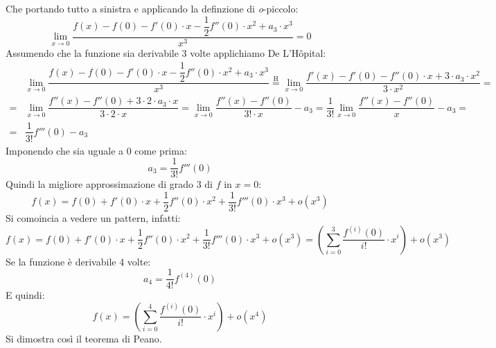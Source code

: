 Che portando tutto a sinistra e applicando la definzione di \textit{o}-piccolo:
\begin{equation*}
	\lim_{x \to 0} \dfrac{f(x) - f(0) - f'(0) \cdot x - \dfrac{1}{2} f''(0) \cdot x^2 + a_3 \cdot x^3}{x^3} = 0
\end{equation*}
Assumendo che la funzione sia derivabile 3 volte applichiamo De L'Hôpital:
\begin{align*}
	&\lim_{x \to 0} \dfrac{f(x) - f(0) - f'(0) \cdot x - \dfrac{1}{2} f''(0) \cdot x^2 + a_3 \cdot x^3}{x^3} \stackrel{\text{H}}{=} \lim_{x \to 0} \dfrac{f'(x) - f'(0) - f''(0) \cdot x + 3 \cdot a_3 \cdot x^2}{3 \cdot x^2} = \\[10pt]
	= &\lim_{x \to 0} \dfrac{f''(x) - f''(0) + 3 \cdot 2 \cdot a_3 \cdot x}{3 \cdot 2 \cdot x} = \lim_{x \to 0} \dfrac{f''(x) - f''(0)}{3! \cdot x} - a_3 = \dfrac{1}{3!} \lim_{x \to 0} \dfrac{f''(x) - f''(0)}{x} - a_3 = \\[10pt]
	= &\dfrac{1}{3!} f'''(0) - a_3
\end{align*}
Imponendo che sia uguale a 0 come prima:
\begin{equation*}
	a_3 = \dfrac{1}{3!} f'''(0)
\end{equation*}
Quindi la migliore approssimazione di grado 3 di $f$ in $x = 0$:
\begin{equation*}
	f(x) = f(0) + f'(0) \cdot x + \dfrac{1}{2} f''(0) \cdot x^2 + \dfrac{1}{3!} f'''(0) \cdot x^3 + o(x^3)
\end{equation*}
Si comoincia a vedere un pattern, infatti:
\begin{equation*}
	f(x) = f(0) + f'(0) \cdot x + \dfrac{1}{2} f''(0) \cdot x^2 + \dfrac{1}{3!} f'''(0) \cdot x^3 + o(x^3) = \left( \sum \limits_{i = 0}^3 \dfrac{f^{(i)}(0)}{i!} \cdot x^i \right) + o(x^3)
\end{equation*}
Se la funzione è derivabile 4 volte:
\begin{equation*}
	a_4 = \dfrac{1}{4!} f^{(4)}(0)
\end{equation*}
E quindi:
\begin{equation*}
	f(x) = \left( \sum \limits_{i = 0}^4 \dfrac{f^{(i)}(0)}{i!} \cdot x^i \right) + o(x^4)
\end{equation*}
Si dimostra così il teorema di Peano.


